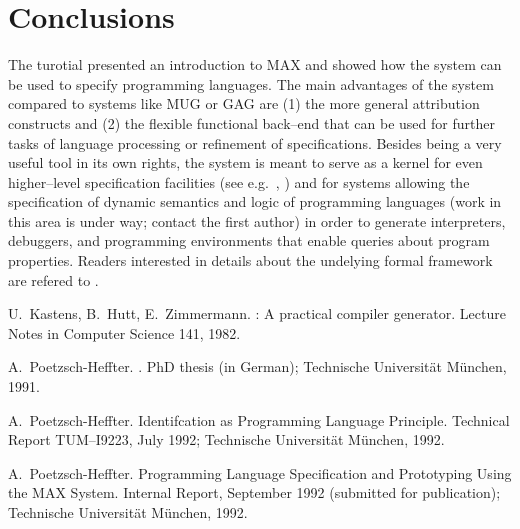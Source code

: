 
\chapter{Conclusions}

The turotial presented an introduction to MAX and showed how the
system can be used to specify programming languages. The main advantages 
of the system compared to systems like MUG or GAG \cite{GAG} are (1) the
more general attribution constructs and (2) the flexible
functional back--end that can be used for further tasks of language
processing or refinement of specifications. Besides being a very
useful tool in its own rights, the system is meant to
serve as a kernel for even higher--level specification facilities (see 
e.g.~\cite{PH:diss}, \cite{PH:identif}) and for systems allowing
the specification of dynamic semantics and logic of programming 
languages (work in this area is under way; contact the first author)
in order to generate interpreters, debuggers, and programming environments
that enable queries about program properties.
Readers interested in details about the undelying formal framework are
refered to \cite{PH:maxsec}.

\vspace*{1cm}

\small
\begin{thebibliography}{KHZ82}

U.~Kastens, B.~Hutt, E.~Zimmermann.
: A practical compiler generator.
\newblock Lecture Notes in Computer Science 141, 1982.

A.~Poetzsch-Heffter.
.
\newblock PhD thesis (in German); Technische Universit\"at M\"unchen, 1991.

A.~Poetzsch-Heffter.
\newblock Identifcation as Programming Language Principle.
\newblock Technical Report TUM--I9223, July 1992;
\newblock Technische Universit\"at M\"unchen, 1992.

A.~Poetzsch-Heffter.
\newblock Programming Language Specification and Prototyping Using the 
MAX System.
\newblock Internal Report, September 1992 (submitted for publication);
\newblock Technische Universit\"at M\"unchen, 1992.

\end{thebibliography}
